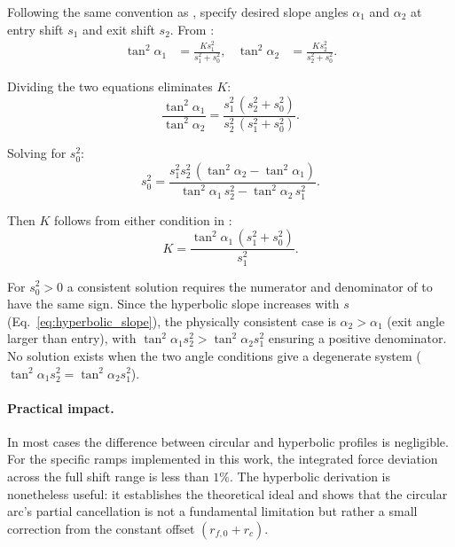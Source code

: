 \documentclass[11pt]{article}
\numberwithin{equation}{section}
\begin{document}
Following the same convention as , specify desired slope
angles $\alpha_1$ and $\alpha_2$ at entry shift $s_1$ and exit shift $s_2$.
From :
\begin{align}
\tan^2\!\alpha_1 &= \frac{K s_1^2}{s_1^2 + s_0^2},
&
\tan^2\!\alpha_2 &= \frac{K s_2^2}{s_2^2 + s_0^2}.
\label{eq:hyperbolic_angle_conditions}
\end{align}

Dividing the two equations eliminates $K$:
\begin{equation}
\frac{\tan^2\!\alpha_1}{\tan^2\!\alpha_2}
=
\frac{s_1^2\,(s_2^2 + s_0^2)}{s_2^2\,(s_1^2 + s_0^2)}.
\end{equation}

Solving for $s_0^2$:
\begin{equation}
s_0^2
=
\frac{s_1^2 s_2^2\,(\tan^2\!\alpha_2 - \tan^2\!\alpha_1)}
     {\tan^2\!\alpha_1\, s_2^2 - \tan^2\!\alpha_2\, s_1^2}.
\label{eq:hyperbolic_s0}
\end{equation}

Then $K$ follows from either condition in :
\begin{equation}
K
=
\frac{\tan^2\!\alpha_1\,(s_1^2 + s_0^2)}{s_1^2}.
\label{eq:hyperbolic_K}
\end{equation}

For $s_0^2 > 0$ a consistent solution requires the numerator and denominator of
 to have the same sign. Since the hyperbolic slope
increases with $s$ (Eq.~\eqref{eq:hyperbolic_slope}), the physically consistent
case is $\alpha_2 > \alpha_1$ (exit angle larger than entry), with
$\tan^2\!\alpha_1 s_2^2 > \tan^2\!\alpha_2 s_1^2$ ensuring a positive
denominator. No solution exists when the two angle conditions give a
degenerate system ($\tan^2\!\alpha_1 s_2^2 = \tan^2\!\alpha_2 s_1^2$).

\paragraph{Practical impact.}

In most cases the difference between circular and hyperbolic profiles is
negligible. For the specific ramps implemented in this work, the integrated
force deviation across the full shift range is less than $1\%$. The hyperbolic
derivation is nonetheless useful: it establishes the theoretical ideal and
shows that the circular arc's partial cancellation is not a fundamental
limitation but rather a small correction from the constant offset $(r_{f,0}+r_c)$.
\end{document}
